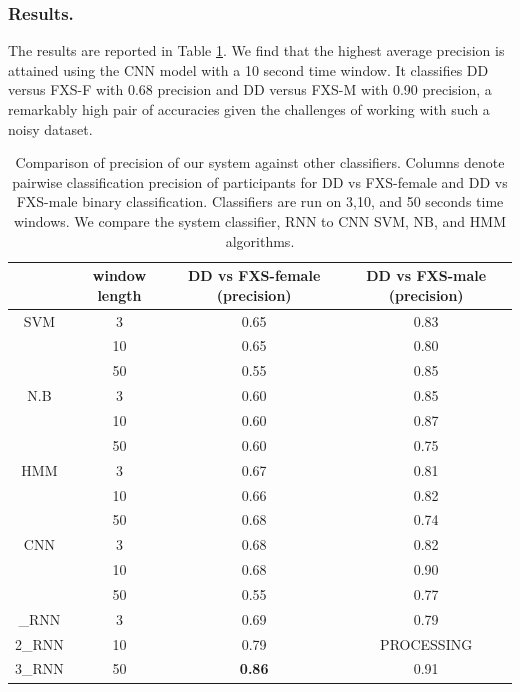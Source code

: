 \documentclass{llncs}
\begin{document}
\vspace*{-\baselineskip}
\subsubsection{Results.} The results are reported in Table  \ref{table:profiler}. We find that the highest average precision is attained using the CNN model with a 10 second time window. It classifies DD versus FXS-F with 0.68 precision and DD versus FXS-M with 0.90 precision, a remarkably high pair of accuracies given the challenges of working with such a noisy dataset. 

\begin{table}
\centering

\begin{tabular}{c|c|c|c}

                 & window length & DD vs FXS-female (precision) & DD vs FXS-male (precision)\\
\hline
SVM  & 3   & 0.65 & 0.83\\
          & 10 & 0.65 & 0.80 \\
          & 50 & 0.55 & 0.85 \\

\hline
N.B   & 3  & 0.60 & 0.85\\
         & 10 & 0.60 & 0.87\\
         & 50 & 0.60 & 0.75\\

\hline
HMM & 3  & 0.67 & 0.81\\ 
    & 10 & 0.66 & 0.82\\
    & 50 & 0.68 & 0.74\\

\hline
CNN & 3 & 0.68 & 0.82 \\
	     & 10 & 0.68 & 0.90\\
    	     & 50 & 0.55 & 0.77\\
\Xhline{4\arrayrulewidth}
\hline
1\_RNN  & 3 &  0.69 & 0.79 \\
2\_RNN  & 10 &   0.79 & PROCESSING\\
3\_RNN  &  50 & {\bf 0.86} & 0.91\\
	     
\end{tabular}
\caption{Comparison of precision of our system against other classifiers. Columns denote pairwise classification precision of participants for DD vs FXS-female and DD vs FXS-male binary classification. Classifiers are run on 3,10, and 50 seconds time windows. We compare the system classifier, RNN to CNN SVM, NB, and HMM algorithms.}
\label{table:profiler}
\end{table}
\end{document}
